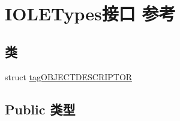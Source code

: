 \hypertarget{interface_i_o_l_e_types}{}\section{I\+O\+L\+E\+Types接口 参考}
\label{interface_i_o_l_e_types}
\subsection*{类}
\begin{DoxyCompactItemize}
\item 
struct \hyperlink{struct_i_o_l_e_types_1_1tag_o_b_j_e_c_t_d_e_s_c_r_i_p_t_o_r}{tag\+O\+B\+J\+E\+C\+T\+D\+E\+S\+C\+R\+I\+P\+T\+OR}
\end{DoxyCompactItemize}
\subsection*{Public 类型}
